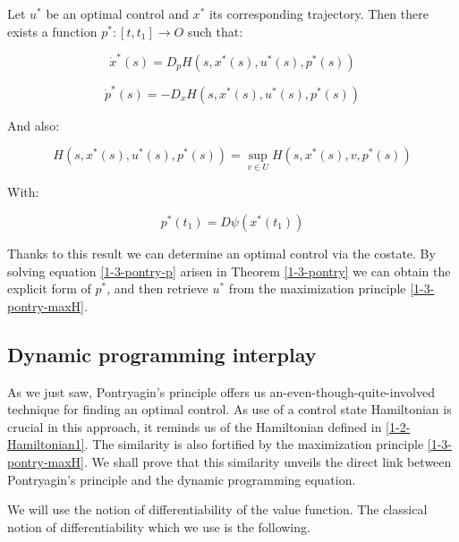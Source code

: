 \begin{theorem}\label{1-3-pontry}
    Let $u^{\ast}$ be an optimal control and $x^{\ast}$ its corresponding trajectory. 
    Then there exists a function $p^{\ast}:[t,t_1]\rightarrow O$ such that:

    \begin{equation}\label{1-3-pontry-x}
        \dot{x}^{\ast}(s) = D_p H(s,x^{\ast}(s),u^{\ast}(s),p^{\ast}(s)) 
    \end{equation}

    \begin{equation}\label{1-3-pontry-p}
        \dot{p}^{\ast}(s) =  - D_x H(s,x^{\ast}(s),u^{\ast}(s),p^{\ast}(s)) 
    \end{equation}

    And also:

    \begin{equation}\label{1-3-pontry-maxH}
        H(s,x^{\ast}(s),u^{\ast}(s),p^{\ast}(s)) = \sup_{v\in U} H(s,x^{\ast}(s),v,p^{\ast}(s))
    \end{equation}

    With:

    \begin{equation}\label{1-3-pontry-tras}
        p^{\ast}(t_1) = D \psi(x^{\ast}(t_1))
    \end{equation}
\end{theorem}

Thanks to this result we can determine an optimal control via the costate. By solving equation \ref{1-3-pontry-p} 
arisen in Theorem \ref{1-3-pontry} we can obtain the explicit form of $p^{\ast}$, and then 
retrieve $u^{\ast}$ from the maximization principle \ref{1-3-pontry-maxH}.


\subsection{Dynamic programming interplay}

As we just saw, Pontryagin's principle offers us an-even-though-quite-involved technique 
for finding an optimal control. As use of a control state Hamiltonian is crucial in this approach, it reminds 
us of the Hamiltonian defined in \ref{1-2-Hamiltonian1}. The similarity is also fortified by the maximization 
principle \ref{1-3-pontry-maxH}. We shall prove that this similarity unveils the direct link between 
Pontryagin's principle and the dynamic programming equation.

We will use the notion of differentiability of the value function. 
The classical notion of differentiability which we use is the following.

